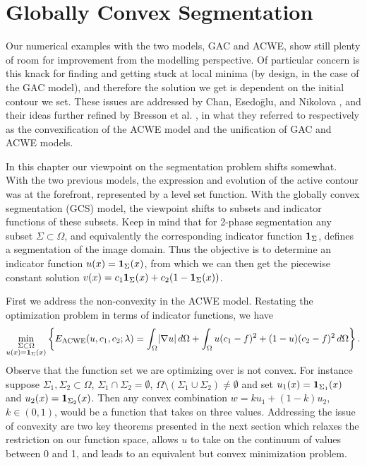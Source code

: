 \chapter{Globally Convex Segmentation}
\label{ch:gcs}
Our numerical examples with the two models, GAC and ACWE, show still plenty of room for improvement from the modelling perspective. Of particular concern is this knack for finding and getting stuck at local minima (by design, in the case of the GAC model), and therefore the solution we get is dependent on the initial contour we set. These issues are addressed by Chan, Esedo\={g}lu, and Nikolova \cite{chan2006algorithms}, and their ideas further refined by Bresson et al. \cite{bresson2007fast}, in what they referred to respectively as the convexification of the ACWE model and the unification of GAC and ACWE models.

In this chapter our viewpoint on the segmentation problem shifts somewhat. With the two previous models, the expression and evolution of the active contour was at the forefront, represented by a level set function. With the globally convex segmentation (GCS) model, the viewpoint shifts to subsets and indicator functions of these subsets. Keep in mind that for 2-phase segmentation any subset $\Sigma \subset \Omega$, and equivalently the corresponding indicator function $\mathbf{1}_\Sigma$, defines a segmentation of the image domain. Thus the objective is to determine an indicator function $u(x) = \mathbf{1}_\Sigma(x)$, from which we can then get the piecewise constant solution $v(x) = c_1 \mathbf{1}_\Sigma(x) + c_2 (1 - \mathbf{1}_\Sigma(x))$. 

First we address the non-convexity in the ACWE model. Restating the optimization problem in terms of indicator functions, we have 
\begin{align}
\min_{\substack{\Sigma\subset\Omega \\ 
		u(x) = \mathbf{1}_\Sigma(x)}} 
\left\{E_\textrm{ACWE}(u, c_1, c_2; \lambda)
= \int_{\Omega} \lvert\nabla u\rvert \,d\Omega 
+ \int_\Omega u(c_1 - f)^2   + (1-u)(c_2 - f)^2 \,d\Omega 
\right\}.
\label{eq:eacwe2}
\end{align}
Observe that the function set we are optimizing over is not convex. For instance suppose $\Sigma_1, \Sigma_2 \subset \Omega$, $\Sigma_1 \cap \Sigma_2 = \emptyset$, $\Omega \setminus (\Sigma_1 \cup \Sigma_2) \neq \emptyset$ and set $u_1(x) = \mathbf{1}_{\Sigma_1}(x)$ and $u_2(x) = \mathbf{1}_{\Sigma_2}(x)$. Then any convex combination $w = ku_1 + (1-k)u_2$, $k \in (0,1)$, would be a function that takes on three values. Addressing the issue of convexity are two key theorems presented in the next section which relaxes the restriction on our function space, allows $u$ to take on the continuum of values between 0 and 1, and leads to an equivalent but convex minimization problem.

